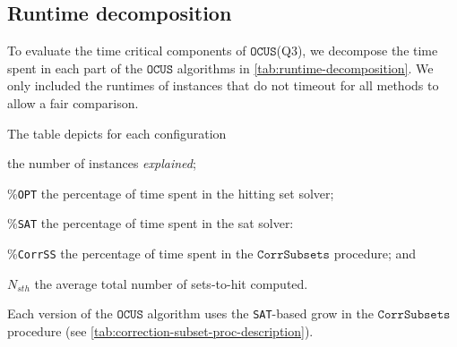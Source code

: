 \documentclass[twoside,11pt]{article}
\newcommand\comment[1]{\marginpar{\tiny #1}}
\renewcommand\comment[1]{#1}
\newcommand{\emilio}[1]{{\comment{\color{red}Emilio: #1}}}
\newcommand\mm[1]{\ensuremath{#1}\xspace}
\newcommand\call[1]{\mm{\texttt{#1}}}
\newcommand\sat{\texttt{{SAT}}\xspace}
\newcommand\comus{\mm{\call{OCUS}}}
\newcommand{\comusbound}{\mm{\call{OCUS\_Bound}}}
\newcommand\comusincr{\mm{\call{OCUS+Incr.}}}
\newcommand\corrss{\mm{\call{CorrSS}}}
\newcommand\corrsubsets{\mm{\call{CorrSubsets}}}
\begin{document}
\subsection{Runtime decomposition} To evaluate the time critical components of \comus (Q3), we decompose the time spent in each part of the \call{OCUS} algorithms in \cref{tab:runtime-decomposition}. We only included the runtimes of instances that do not timeout for all methods to allow a fair comparison. 
	
	The table depicts for each configuration 
\begin{inparaenum}[(1)]
	\item the number of instances \emph{explained};
	\item \%\texttt{OPT} the percentage of time spent in the hitting set solver;
	\item \%\sat the percentage of time spent in the sat solver:
	\item \%\texttt{CorrSS} the percentage of time spent in the \corrsubsets procedure; and
	\item $N_{sth}$ the average total number of sets-to-hit computed.
\end{inparaenum}
Each version of the \comus algorithm uses the \sat-based grow in the \corrsubsets procedure (see \cref{tab:correction-subset-proc-description}).
\end{document}
